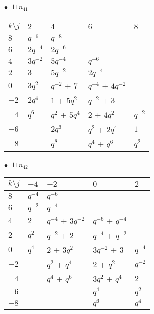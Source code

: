 \begin{minipage}{\linewidth}
$\bullet\ $ $11n_{41}$ \vspace{0.5em} \\
\begin{tabular}{l|llll}
$k \setminus j$ & $2$ & $4$ & $6$ & $8$ \\
\hline
$8$ & $q^{-6}$ & $q^{-8}$ &  &  \\
$6$ & $2q^{-4}$ & $2q^{-6}$ &  &  \\
$4$ & $3q^{-2}$ & $5q^{-4}$ & $q^{-6}$ &  \\
$2$ & $3$ & $5q^{-2}$ & $2q^{-4}$ &  \\
$0$ & $3q^{2}$ & $q^{-2}$ + $7$ & $q^{-4}$ + $4q^{-2}$ &  \\
$-2$ & $2q^{4}$ & $1$ + $5q^{2}$ & $q^{-2}$ + $3$ &  \\
$-4$ & $q^{6}$ & $q^{2}$ + $5q^{4}$ & $2$ + $4q^{2}$ & $q^{-2}$ \\
$-6$ &  & $2q^{6}$ & $q^{2}$ + $2q^{4}$ & $1$ \\
$-8$ &  & $q^{8}$ & $q^{4}$ + $q^{6}$ & $q^{2}$ \\
\end{tabular}
\vspace{2em}
\end{minipage}
%
\begin{minipage}{\linewidth}
$\bullet\ $ $11n_{42}$ \vspace{0.5em} \\
\begin{tabular}{l|llll}
$k \setminus j$ & $-4$ & $-2$ & $0$ & $2$ \\
\hline
$8$ & $q^{-4}$ & $q^{-6}$ &  &  \\
$6$ & $q^{-2}$ & $q^{-4}$ &  &  \\
$4$ & $2$ & $q^{-4}$ + $3q^{-2}$ & $q^{-6}$ + $q^{-4}$ &  \\
$2$ & $q^{2}$ & $q^{-2}$ + $2$ & $q^{-4}$ + $q^{-2}$ &  \\
$0$ & $q^{4}$ & $2$ + $3q^{2}$ & $3q^{-2}$ + $3$ & $q^{-4}$ \\
$-2$ &  & $q^{2}$ + $q^{4}$ & $2$ + $q^{2}$ & $q^{-2}$ \\
$-4$ &  & $q^{4}$ + $q^{6}$ & $3q^{2}$ + $q^{4}$ & $2$ \\
$-6$ &  &  & $q^{4}$ & $q^{2}$ \\
$-8$ &  &  & $q^{6}$ & $q^{4}$ \\
\end{tabular}
\vspace{2em}
\end{minipage}
